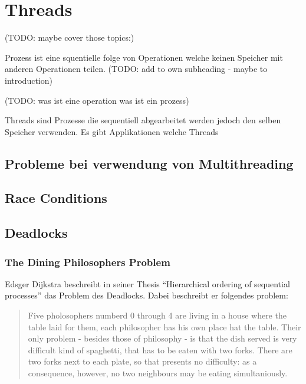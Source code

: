 \section{Threads}
\label{section: Threads}


(TODO: maybe cover those topics:)



Prozess ist eine squentielle folge von Operationen welche keinen Speicher mit anderen Operationen teilen. (TODO: add to own subheading - maybe to introduction)


(TODO: was ist eine operation was ist ein prozess)

Threads sind Prozesse die sequentiell abgearbeitet werden jedoch den selben Speicher verwenden. \cite[p. 2]{Lee06} Es gibt Applikationen welche Threads








\subsection{Probleme bei verwendung von Multithreading}

\subsection{Race Conditions}

\subsection{Deadlocks}

\subsubsection{The Dining Philosophers Problem}

Edsger Dijkstra beschreibt in seiner Thesis ``Hierarchical ordering of sequential processes'' das Problem des Deadlocks. Dabei beschreibt er folgendes problem:

\begin{quote}
	Five pholosophers numberd 0 through 4 are living in a house where the table laid for them, each philosopher has his own place hat the table. Their only problem - besides those of philosophy - is that the dish served is very difficult kind of spaghetti, that has to be eaten with two forks. There are two forks next to each plate, so that presents no difficulty: as a consequence, however, no two neighbours may be eating simultaniously. \cite[p. 21]{dij71}
\end{quote} 

